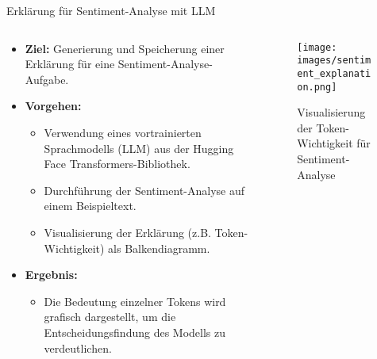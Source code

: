 \documentclass[aspectratio=1610, xcolor=dvipsnames, 9pt]{beamer}
\begin{document}
\begin{frame}{Erklärung für Sentiment-Analyse mit LLM}
  \begin{columns}
    \begin{column}{0.6\textwidth}
      \begin{itemize}
        \item \textbf{Ziel:} Generierung und Speicherung einer Erklärung für eine Sentiment-Analyse-Aufgabe.
        \item \textbf{Vorgehen:}
        \begin{itemize}
          \item Verwendung eines vortrainierten Sprachmodells (LLM) aus der Hugging Face Transformers-Bibliothek.
          \item Durchführung der Sentiment-Analyse auf einem Beispieltext.
          \item Visualisierung der Erklärung (z.B. Token-Wichtigkeit) als Balkendiagramm.
        \end{itemize}
        \item \textbf{Ergebnis:} 
        \begin{itemize}
          \item Die Bedeutung einzelner Tokens wird grafisch dargestellt, um die Entscheidungsfindung des Modells zu verdeutlichen.
        \end{itemize}
      \end{itemize}
    \end{column}
    \begin{column}{0.4\textwidth}
      \begin{figure}
        \centering
        \texttt{[image: images/sentiment\_explanation.png]}
        \caption{Visualisierung der Token-Wichtigkeit für Sentiment-Analyse}
      \end{figure}
    \end{column}
  \end{columns}
\end{frame}
\end{document}
